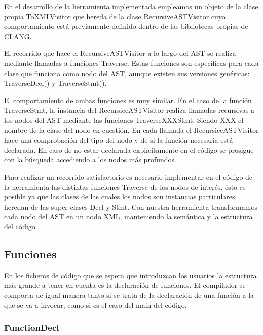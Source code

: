 En el desarrollo de la herramienta implementada empleamos un objeto de la clase propia ToXMLVisitor que hereda de la clase RecursiveASTVisitor cuyo comportamiento est\'a previamente definido dentro de las bibliotecas propias de CLANG.

El recorrido que hace el RecursiveASTVisitor a lo largo del AST se realiza mediante llamadas a funciones Traverse. Estas funciones son espec\'ificas para cada clase que funciona como nodo del AST, aunque existen sus versiones gen\'ericas: TraverseDecl() y TraverseStmt().

El comportamiento de ambas funciones es muy similar. En el caso de la funci\'on TraverseStmt, la instancia del RecursiceASTVisitor realiza llamadas recursivas a los nodos del AST mediante las funciones TraverseXXXStmt. Siendo XXX el nombre de la clase del nodo en cuesti\'on. En cada llamada el RecursiceASTVisitor hace una comprobaci\'on del tipo del nodo y de si la funci\'on necesaria est\'a declarada. En caso de no estar declarada expl\'icitamente en el c\'odigo se prosigue con la b\'usqueda accediendo a los nodos m\'as profundos.

Para realizar un recorrido satisfactorio es necesario implementar en el c\'odigo de la herramienta las distintas funciones Traverse de los nodos de inter\'es. \'esto es posible ya que las clases de las cuales los nodos son instancias particulares heredan de las super clases Decl y Stmt. Con nuestra herramienta transformamos cada nodo del AST en un nodo XML, manteniendo la sem\'antica y la estructura del c\'odigo.

\subsection{Funciones}

En los ficheros de c\'odigo que se espera que introduzcan los usuarios la estructura m\'as grande a tener en cuenta es la declaraci\'on de funciones. El compilador se comporta de igual manera tanto si se trata de la declaraci\'on de una funci\'on a la que se va a invocar, como si es el caso del main del c\'odigo.

\subsubsection*{FunctionDecl}

